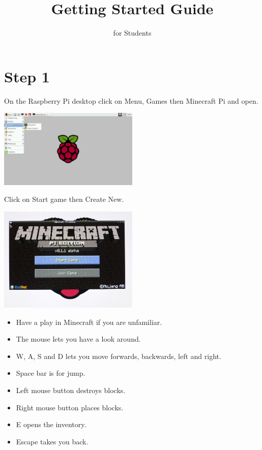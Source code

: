 \documentclass{geocraft-worksheet-multipage}
\begin{document}
\title{Getting Started Guide}
\subtitle{for Students}
\date{}

\maketitle
 
\section*{Step 1}
On the Raspberry Pi desktop click on Menu, Games then Minecraft Pi and
open.\vspace{0.5cm}

\includegraphics[width=0.5\textwidth]{pic1}\vspace{0.5cm}

Click on Start game then Create New.\vspace{0.5cm}

\includegraphics[width=0.5\textwidth]{pic2}\vspace{0.5cm}

\begin{itemize}
\item Have a play in Minecraft if you are unfamiliar.
\item The mouse lets you have a look around.
\item W, A, S and D lets you move forwards, backwards, left and right.
\item Space bar is for jump.
\item Left mouse button destroys blocks.
\item Right mouse button places blocks.
\item E opens the inventory.
\item Escape takes you back.
\end{itemize}
\end{document}
